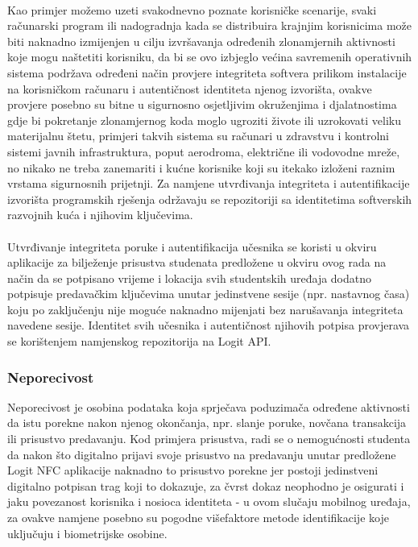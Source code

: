 \paragraph*{}
Kao primjer možemo uzeti svakodnevno poznate korisničke scenarije, svaki računarski program ili nadogradnja kada se distribuira krajnjim korisnicima može biti naknadno izmijenjen u cilju izvršavanja određenih zlonamjernih aktivnosti koje mogu naštetiti korisniku, da bi se ovo izbjeglo većina savremenih operativnih sistema podržava određeni način provjere integriteta softvera prilikom instalacije na korisničkom računaru i autentičnost identiteta njenog izvorišta, ovakve provjere posebno su bitne u sigurnosno osjetljivim okruženjima i djalatnostima gdje bi pokretanje zlonamjernog koda moglo ugroziti živote ili uzrokovati veliku materijalnu štetu, primjeri takvih sistema su računari u zdravstvu i kontrolni sistemi javnih infrastruktura, poput aerodroma, električne ili vodovodne mreže, no nikako ne treba zanemariti i kućne korisnike koji su itekako izloženi raznim vrstama sigurnosnih prijetnji. Za namjene utvrđivanja integriteta i autentifikacije izvorišta programskih rješenja održavaju se repozitoriji sa identitetima softverskih razvojnih kuća i njihovim ključevima.

\paragraph*{}
Utvrđivanje integriteta poruke i autentifikacija učesnika se koristi u okviru aplikacije za bilježenje prisustva studenata predložene u okviru ovog rada na način da se potpisano vrijeme i lokacija svih studentskih uređaja dodatno potpisuje predavačkim ključevima unutar jedinstvene sesije (npr. nastavnog časa) koju po zaključenju nije moguće naknadno mijenjati bez narušavanja integriteta navedene sesije. Identitet svih učesnika i autentičnost njihovih potpisa provjerava se korištenjem namjenskog repozitorija na Logit API.

\subsubsection*{Neporecivost}
Neporecivost je osobina podataka koja sprječava poduzimača određene aktivnosti da istu porekne nakon njenog okončanja, npr. slanje poruke, novčana transakcija ili prisustvo predavanju. Kod primjera prisustva, radi se o nemogućnosti studenta da nakon što digitalno prijavi svoje prisustvo na predavanju unutar predložene Logit NFC aplikacije naknadno to prisustvo porekne jer postoji jedinstveni digitalno potpisan trag koji to dokazuje, za čvrst dokaz neophodno je osigurati i jaku povezanost korisnika i nosioca identiteta - u ovom slučaju mobilnog uređaja, za ovakve namjene posebno su pogodne višefaktore metode identifikacije koje uključuju i biometrijske osobine.

